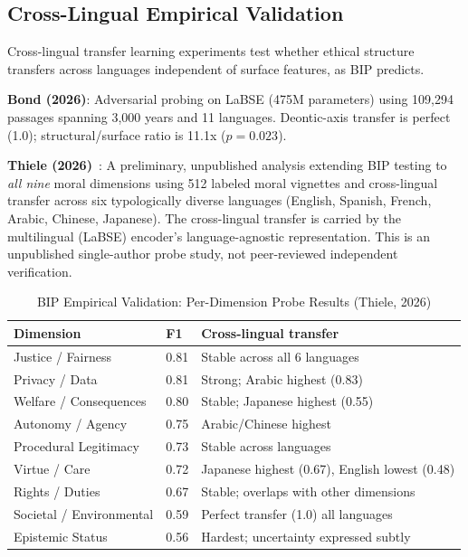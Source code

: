 \documentclass[conference]{IEEEtran}
\begin{document}
\subsection{Cross-Lingual Empirical Validation}

Cross-lingual transfer learning experiments test whether ethical structure transfers across languages independent of surface features, as BIP predicts.

\textbf{Bond (2026)}: Adversarial probing on LaBSE (475M parameters) using 109,294 passages spanning 3,000 years and 11 languages. Deontic-axis transfer is perfect (1.0); structural/surface ratio is 11.1x ($p=0.023$).

\textbf{Thiele (2026)}~\cite{thiele2026}: A preliminary, unpublished analysis extending BIP testing to \emph{all nine} moral dimensions using 512 labeled moral vignettes and cross-lingual transfer across six typologically diverse languages (English, Spanish, French, Arabic, Chinese, Japanese). The cross-lingual transfer is carried by the multilingual (LaBSE) encoder's language-agnostic representation. This is an unpublished single-author probe study, not peer-reviewed independent verification.

\begin{table}[t]
\caption{BIP Empirical Validation: Per-Dimension Probe Results (Thiele, 2026)}
\label{tab:bip-results}
\centering
\footnotesize
\begin{tabular}{@{}p{2.8cm}p{0.8cm}p{3.5cm}@{}}
\toprule
Dimension & F1 & Cross-lingual transfer \\
\midrule
Justice / Fairness & 0.81 & Stable across all 6 languages \\
Privacy / Data & 0.81 & Strong; Arabic highest (0.83) \\
Welfare / Consequences & 0.80 & Stable; Japanese highest (0.55) \\
Autonomy / Agency & 0.75 & Arabic/Chinese highest \\
Procedural Legitimacy & 0.73 & Stable across languages \\
Virtue / Care & 0.72 & Japanese highest (0.67), English lowest (0.48) \\
Rights / Duties & 0.67 & Stable; overlaps with other dimensions \\
Societal / Environmental & 0.59 & Perfect transfer (1.0) all languages \\
Epistemic Status & 0.56 & Hardest; uncertainty expressed subtly \\
\bottomrule
\end{tabular}
\end{table}
\end{document}
